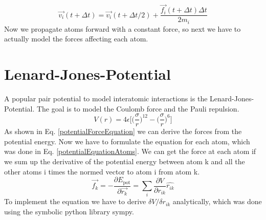 \begin{equation}
	\label{verletCorrection}
	\overrightarrow{v_{i}}(t+\Delta t) = \overrightarrow{v_{i}}(t+\Delta t/2) +
	\frac{\overrightarrow{f_{i}}(t + \Delta t)\Delta t}{2m_{i}}
\end{equation}
Now we propagate atoms forward with a constant force, so next we have to actually model the forces affecting each atom.


\section{Lenard-Jones-Potential}
\begin{comment}
- pair potential
\end{comment}
A popular pair potential to model interatomic interactions is the Lenard-Jones-Potential. 
The goal is to model the Coulomb force and the Pauli repulsion. 
\begin{equation}
	V(r) = 4\epsilon\bigg[\Big(\frac{\sigma}{r}\Big)^{12}- \Big(\frac{\sigma}{r}\Big)^{6} \bigg]
\end{equation}
As shown in Eq. \ref{potentialForceEquation} we can derive the forces from the potential energy. Now we have to formulate the equation for each atom, which was done in Eq. \ref {potentialEquationAtoms}. We can get the force at each atom if we sum up the derivative of the potential energy between atom k and all the other atoms i times the normed vector to atom i from atom k. 
\begin{equation}
	\label{potentialEquationAtoms}
	\overrightarrow{f_{k}} = -\frac{\partial E_{\mathrm{pot}}}{\partial  \overrightarrow{r_{k}}}=\sum_{i}^{}\frac{\partial V}{\partial r_{ik}} \hat{r_{ik}}
\end{equation}
To implement the equation we have to derive $\delta V/ \delta r_{ik}$ analytically, which was done using the symbolic python library sympy. 
